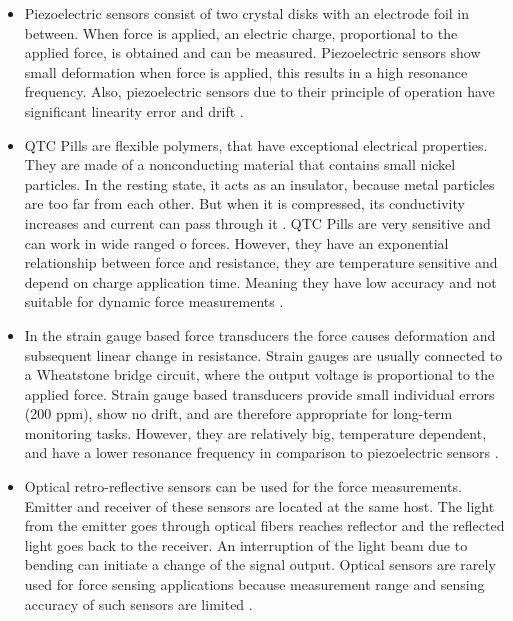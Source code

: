 \begin{itemize}
\item Piezoelectric sensors consist of two crystal disks with an electrode foil in between. When force is applied, an electric charge, proportional to the applied force, is obtained and can be measured. Piezoelectric sensors show small deformation when force is applied, this results in a high resonance frequency. Also, piezoelectric sensors due to their principle of operation have significant linearity error and drift \cite{SGandP2}.

\item QTC Pills are flexible polymers, that have exceptional electrical properties. They are made of a nonconducting material that contains small nickel particles.  In the resting state, it acts as an insulator, because metal particles are too far from each other. But when it is compressed, its conductivity increases and current can pass through it \cite{azaman_characteristic_2016}. QTC Pills are very sensitive and can work in wide ranged o forces. However, they have an exponential relationship between force and resistance, they are temperature sensitive and depend on charge application time. Meaning they have low accuracy and not suitable for dynamic force measurements \cite{_quantum_2010}.

\item In the strain gauge based force transducers the force causes deformation and subsequent linear change in resistance. Strain gauges are usually connected to a Wheatstone bridge circuit, where the output voltage is proportional to the applied force. Strain gauge based transducers provide small individual errors (200 ppm), show no drift, and are therefore appropriate for long-term monitoring tasks. However, they are relatively big, temperature dependent, and have a lower resonance frequency in comparison to piezoelectric sensors \cite{SGandP1,SGandP2}.

\item Optical retro-reflective sensors can be used for the force measurements. Emitter and receiver of these sensors are located at the same host. The light from the emitter goes through optical fibers reaches reflector and the reflected light goes back to the receiver. An interruption of the light beam due to bending can initiate a change of the signal output. Optical sensors are rarely used for force sensing applications because measurement range and sensing accuracy of such sensors are limited \cite{su_fiber_optic_2017}.
\end{itemize}

